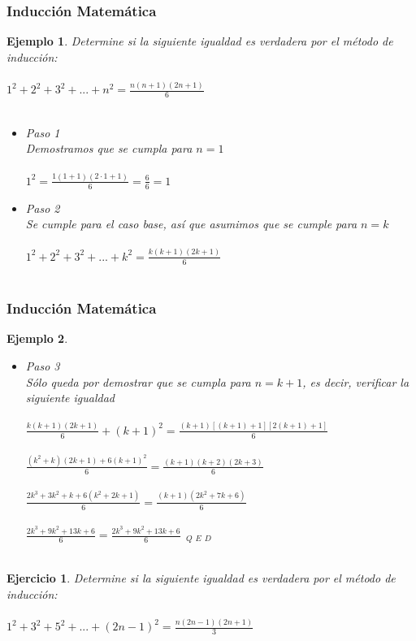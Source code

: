 \documentclass[11pt]{beamer}
\newtheorem{eje}{Ejercicio}
\newtheorem{ejem}{Ejemplo}
\begin{document}
\begin{frame}
\frametitle{Inducción Matemática}
\begin{ejem}
Determine si la siguiente igualdad es verdadera por el método de inducción:\\ \hspace{0cm} \\
$1^2 + 2^2 + 3^2 + ... + n^2 = \frac{n(n + 1)(2n + 1)}{6}$\\ \hspace{0cm} \\
\begin{itemize}
\item Paso 1\\
Demostramos que se cumpla para $n = 1$\\ \hspace{0cm} \\
$1^2 = \frac{1(1 + 1)(2\cdot1 + 1)}{6} = \frac{6}{6} = 1$
\item Paso 2\\
Se cumple para el caso base, así que asumimos que se cumple para $n = k$\\ \hspace{0cm} \\
$1^2 + 2^2 + 3^2 + ... + k^2 = \frac{k(k + 1)(2k + 1)}{6}$\\ \hspace{0cm} \\
\end{itemize}
\end{ejem}
\end{frame}

\begin{frame}
\frametitle{Inducción Matemática}
\begin{ejem}
\begin{itemize}
\item Paso 3\\
Sólo queda por demostrar que se cumpla para $n = k+1$, es decir, verificar la siguiente igualdad\\ \hspace{0cm} \\
$\frac{k(k + 1)(2k + 1)}{6} + (k+1)^2 = \frac{(k+1)[(k+1) + 1][2(k + 1)+1]}{6}$\\ \hspace{0cm} \\
$\frac{(k^2 + k)(2k + 1)+6(k+1)^2}{6} = \frac{(k+1)(k+2)(2k + 3)}{6}$\\ \hspace{0cm} \\
$\frac{2k^3+3k^2+k+6(k^2+2k+1)}{6} = \frac{(k+1)(2k^2+7k+6)}{6}$\\ \hspace{0cm} \\
$\frac{2k^3+9k^2+13k+6}{6} = \frac{2k^3+9k^2+13k+6}{6} ~ ~ _Q ~ _E ~ _D$\\ \hspace{0cm} \\
\end{itemize}
\end{ejem}
\end{frame}

\begin{frame}
\begin{eje}
Determine si la siguiente igualdad es verdadera por el método de inducción:\\ \hspace{0cm} \\
$1^2+3^2+5^2+...+(2n-1)^2 = \frac{n(2n-1)(2n+1)}{3}$
\end{eje}
\end{frame}
\end{document}
